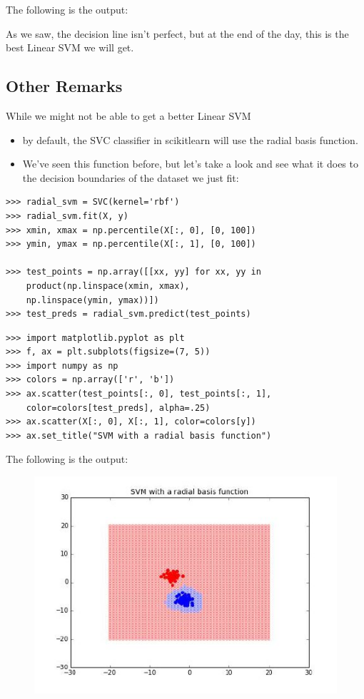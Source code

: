 \documentclass[SKL-MASTER.tex]{subfiles}
\begin{document}
The following is the output:


As we saw, the decision line isn't perfect, but at the end of the day, this is the best Linear SVM
we will get.
\subsection*{Other Remarks}
While we might not be able to get a better Linear SVM \begin{itemize}
\item by default, the SVC classifier in scikitlearn
will use the radial basis function. 
\item We've seen this function before, but let's take a look
and see what it does to the decision boundaries of the dataset we just fit:
\end{itemize}
\begin{framed}
\begin{verbatim}
>>> radial_svm = SVC(kernel='rbf')
>>> radial_svm.fit(X, y)
>>> xmin, xmax = np.percentile(X[:, 0], [0, 100])
>>> ymin, ymax = np.percentile(X[:, 1], [0, 100])

>>> test_points = np.array([[xx, yy] for xx, yy in
    product(np.linspace(xmin, xmax),
    np.linspace(ymin, ymax))])
>>> test_preds = radial_svm.predict(test_points)
\end{verbatim}
\end{framed}
\begin{framed}
	\begin{verbatim}
>>> import matplotlib.pyplot as plt
>>> f, ax = plt.subplots(figsize=(7, 5))
>>> import numpy as np
>>> colors = np.array(['r', 'b'])
>>> ax.scatter(test_points[:, 0], test_points[:, 1],
    color=colors[test_preds], alpha=.25)
>>> ax.scatter(X[:, 0], X[:, 1], color=colors[y])
>>> ax.set_title("SVM with a radial basis function")
\end{verbatim}
\end{framed}
The following is the output:
\begin{figure}
\centering
\includegraphics[width=0.7\linewidth]{images/SKL43-SVMs-3}

\end{figure}
\end{document}
